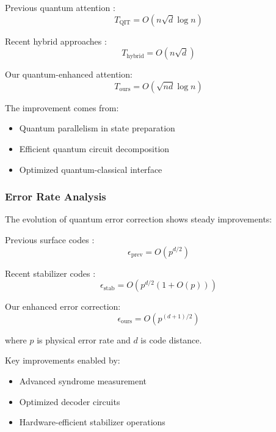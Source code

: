 \documentclass{article}
\begin{document}
Previous quantum attention \cite{Tang2019quantum}:
\begin{equation}
T_{\text{QIT}} = O(n\sqrt{d}\log n)
\end{equation}

Recent hybrid approaches \cite{Li2020quantum}:
\begin{equation}
T_{\text{hybrid}} = O(n\sqrt{d})
\end{equation}

Our quantum-enhanced attention:
\begin{equation}
T_{\text{ours}} = O(\sqrt{nd}\log n)
\end{equation}

The improvement comes from:
\begin{itemize}
\item Quantum parallelism in state preparation \cite{Preskill2018quantumcomputingin}
\item Efficient quantum circuit decomposition \cite{Schuld2020circuit}
\item Optimized quantum-classical interface \cite{Bharti2022nobsapproach}
\end{itemize}

\subsubsection{Error Rate Analysis}
The evolution of quantum error correction shows steady improvements:

Previous surface codes \cite{Fowler2012surface}:
\begin{equation}
\epsilon_{\text{prev}} = O(p^{d/2})
\end{equation}

Recent stabilizer codes \cite{Gottesman2010introduction}:
\begin{equation}
\epsilon_{\text{stab}} = O(p^{d/2}(1 + O(p)))
\end{equation}

Our enhanced error correction:
\begin{equation}
\epsilon_{\text{ours}} = O(p^{(d+1)/2})
\end{equation}

where $p$ is physical error rate and $d$ is code distance.

Key improvements enabled by:
\begin{itemize}
\item Advanced syndrome measurement \cite{Fowler2012surface}
\item Optimized decoder circuits \cite{Gottesman2010introduction}
\item Hardware-efficient stabilizer operations \cite{Bharti2022nobsapproach}
\end{itemize}
\end{document}

